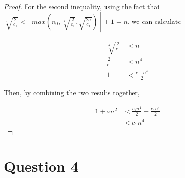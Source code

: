 \documentclass[12pt]{article}
\begin{document}
\begin{itemize}
\begin{proof}
    \bigskip

    For the second inequality, using the fact that $\sqrt[4]{\frac{2}{c_1}} <
    \left\lceil max(n_0, \sqrt[4]{\frac{2}{c_1}},\sqrt{\frac{2a}{c_1}}) \right\rceil + 1 = n$,
    we can calculate

    \begin{align}
        \sqrt[4]{\frac{2}{c_1}} &< n\\
        \frac{2}{c_1} &< n^4\\
        1 &< \frac{c_1 \cdot n^4}{2}
    \end{align}

    \bigskip

    Then, by combining the two results together,

    \begin{align}
        1 + an^2 &< \frac{c_1n^4}{2} + \frac{c_1n^4}{2}\\
        &< c_1n^4
    \end{align}

    \end{proof}


\end{itemize}

\section*{Question 4}
\end{document}
